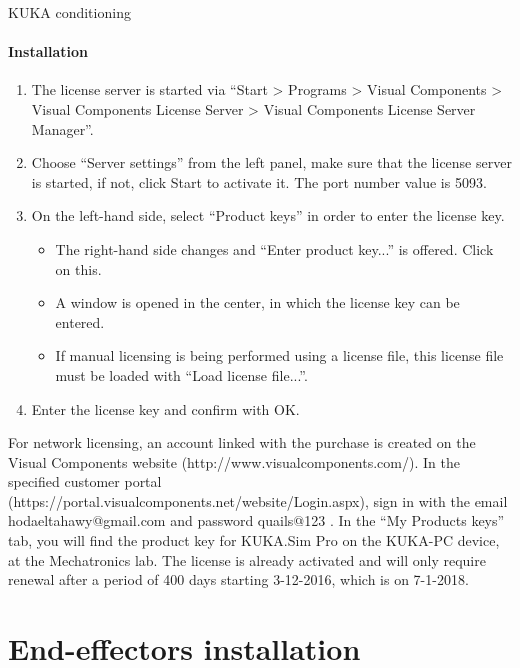 \documentclass{book}
\begin{document}
\begin{chapter}{KUKA conditioning}
 				\paragraph{Installation}
 					\begin{enumerate}
 						\item The license server is started via “Start > Programs > Visual Components > Visual Components License Server > Visual Components License Server Manager”.
 						\item Choose “Server settings” from the left panel, make sure that the license server is started, if not, click Start to activate it. The port number value is 5093.
 						\item On the left-hand side, select “Product keys” in order to enter the license key.
 							\begin{itemize}
 								\item The right-hand side changes and “Enter product key...” is offered. Click on this.
 								\item A window is opened in the center, in which the license key can be entered.
 								\item If manual licensing is being performed using a license file, this license file must be loaded with “Load license file...”.
 							\end{itemize}
 						\item Enter the license key and confirm with OK.
 					\end{enumerate}
 				
 				For network licensing, an account linked with the purchase is created on the Visual Components website (http://www.visualcomponents.com/). In the specified customer portal (https://portal.visualcomponents.net/website/Login.aspx), sign in with the email hodaeltahawy@gmail.com and password quails@123 . In the “My Products keys” tab, you will find the product key for KUKA.Sim Pro on the KUKA-PC device, at the Mechatronics lab. The license is already activated and will only require renewal after a period of 400 days starting 3-12-2016, which is on 7-1-2018. 
	 
	 \newpage
	 \section{End-effectors installation}

\end{chapter}
\end{document}
